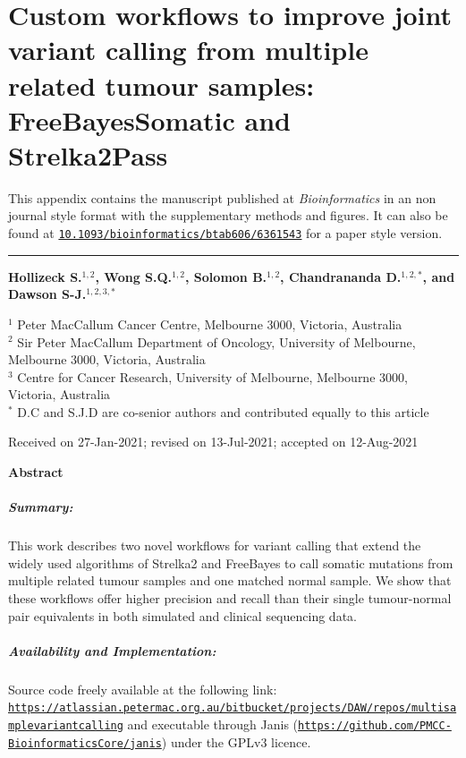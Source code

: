 \chapter[Strelka2Pass and FreeBayesSomatic publication]{Custom workflows to improve joint variant calling from multiple related tumour samples: FreeBayesSomatic and Strelka2Pass}
\label{ch:appendixManuscript}

This appendix contains the manuscript published at \textit{Bioinformatics} in an non journal style format with the supplementary methods and figures. It can also be found at \href{https://doi.org/10.1093/bioinformatics/btab606/6361543}{\nolinkurl{10.1093/bioinformatics/btab606/6361543}} for a paper style version.
\vspace{1em}
\hrule
\vspace{2em}

{\Large \textbf{Hollizeck S.$^{1,2}$, Wong S.Q.$^{1,2}$, Solomon B.$^{1,2}$, Chandrananda D.$^{1,2,*}$, and Dawson S-J.$^{1,2,3,*}$}}

{
$^1$ Peter MacCallum Cancer Centre, Melbourne 3000, Victoria, Australia\\
$^2$ Sir Peter MacCallum Department of Oncology, University of Melbourne, Melbourne 3000, Victoria, Australia\\
$^3$ Centre for Cancer Research, University of Melbourne, Melbourne 3000, Victoria, Australia\\
\vspace{0.5em}
$^*$ D.C and S.J.D are co-senior authors and contributed equally to this article
}

{\small
Received on 27-Jan-2021; revised on 13-Jul-2021; accepted on 12-Aug-2021
}

{\Large \textbf{Abstract}}
\vspace{-2em}
\paragraph*{\textbf{Summary:}} This work describes two novel workflows for variant calling that extend the widely used algorithms of Strelka2 and FreeBayes to call somatic mutations from multiple related tumour samples and one matched normal sample. We show that these workflows offer higher precision and recall than their single tumour-normal pair equivalents in both simulated and clinical sequencing data.
\vspace{-2em}
\paragraph*{\textbf{Availability and Implementation:}} Source code freely available at the following link:
\href{https://atlassian.petermac.org.au/bitbucket/projects/DAW/repos/multisamplevariantcalling}{\nolinkurl{https://atlassian.petermac.org.au/bitbucket/projects/DAW/repos/multisamplevariantcalling}}
and executable through Janis (\href{https://github.com/PMCC-BioinformaticsCore/janis}{\nolinkurl{https://github.com/PMCC-BioinformaticsCore/janis}}) under the GPLv3 licence.
\vspace{-2em}
